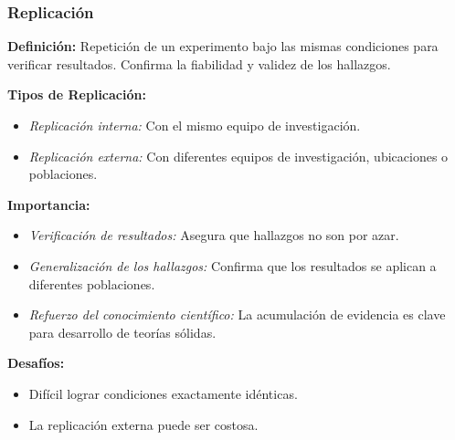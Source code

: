 ﻿\documentclass{beamer}
\begin{document}
\begin{frame}
\frametitle{Replicación}
\textbf{Definición:} Repetición de un experimento bajo las mismas condiciones para verificar resultados. Confirma la fiabilidad y validez de los hallazgos.

\textbf{Tipos de Replicación:}
\begin{itemize}
    \item \textit{Replicación interna:} Con el mismo equipo de investigación.
    \item \textit{Replicación externa:} Con diferentes equipos de investigación, ubicaciones o poblaciones.
\end{itemize}

\textbf{Importancia:}
\begin{itemize}
    \item \textit{Verificación de resultados:} Asegura que hallazgos no son por azar.
    \item \textit{Generalización de los hallazgos:} Confirma que los resultados se aplican a diferentes  poblaciones.
    \item \textit{Refuerzo del conocimiento científico:} La acumulación de evidencia es clave para  desarrollo de teorías sólidas.
\end{itemize}

\textbf{Desafíos:}
\begin{itemize}
    \item Difícil lograr condiciones exactamente idénticas.
    \item La replicación externa puede ser costosa.
\end{itemize}
\end{frame}
\end{document}
